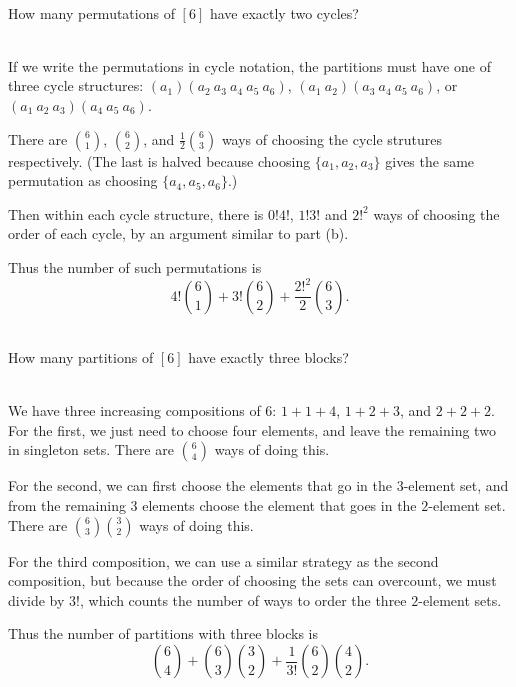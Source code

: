 \documentclass{article}
\newenvironment{problem}[2][Problem]{\begin{trivlist}
\item[\hskip \labelsep {\bfseries #1}\hskip \labelsep {\bfseries #2.}]}{\end{trivlist}}
\newenvironment{solution}[1][Solution.]{\begin{trivlist}
\item[\hskip \labelsep {\bfseries #1}]}{\end{trivlist}}
\begin{document}
\begin{problem}{2 (d)} \text{} \\
  How many permutations of $[6]$ have exactly two cycles?
\end{problem}

\begin{solution} \text{} \\
  If we write the permutations in cycle notation, the partitions must have one
  of three cycle structures: $(a_1)(a_2\ a_3\ a_4\ a_5\ a_6)$,
  $(a_1\ a_2)(a_3\ a_4\ a_5\ a_6)$, or $(a_1\ a_2\ a_3)(a_4\ a_5\ a_6)$.

  There are $\binom{6}{1}$, $\binom{6}{2}$, and $\frac{1}{2}\binom{6}{3}$ ways
  of choosing the cycle strutures respectively. (The last is halved because
  choosing $\{a_1, a_2, a_3\}$ gives the same permutation as choosing $\{a_4, a_5, a_6\}$.)

  Then within each cycle structure, there is $0!4!$, $1!3!$ and $2!^2$ ways of
  choosing the order of each cycle, by an argument similar to part (b).

  Thus the number of such permutations is \[
    4!\binom{6}{1} + 3!\binom{6}{2} + \frac{2!^2}{2}\binom{6}{3}.
  \]
\end{solution}

\begin{problem}{2 (e)} \text{} \\
  How many partitions of $[6]$ have exactly three blocks?
\end{problem}

\begin{solution} \text{} \\
  We have three increasing compositions of $6$: $1 + 1 + 4$, $1 + 2 + 3$, and
  $2 + 2 + 2$.
  For the first, we just need to choose four elements, and leave the remaining
  two in singleton sets. There are $\binom{6}{4}$ ways of doing this.

  For the second, we can first choose the elements that go in the $3$-element set,
  and from the remaining $3$ elements choose the element that goes in the $2$-element set.
  There are $\binom{6}{3}\binom{3}{2}$ ways of doing this.

  For the third composition, we can use a similar strategy as the second composition,
  but because the order of choosing the sets can overcount, we must divide by $3!$,
  which counts the number of ways to order the three $2$-element sets.

  Thus the number of partitions with three blocks is \[
    \binom{6}{4}
    + \binom{6}{3}\binom{3}{2}
    + \frac{1}{3!}\binom{6}{2}\binom{4}{2}.
  \]
\end{solution}
\end{document}
